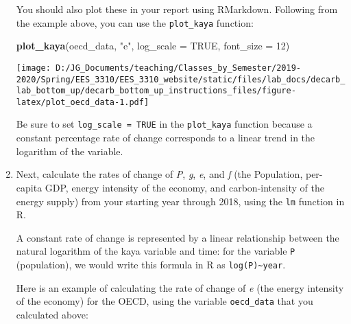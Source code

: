 \documentclass[
]{article}
\newenvironment{Shaded}{\begin{snugshade}}{\end{snugshade}}
\newcommand{\CommentTok}[1]{\textcolor[rgb]{0.56,0.35,0.01}{\textit{#1}}}
\newcommand{\DataTypeTok}[1]{\textcolor[rgb]{0.13,0.29,0.53}{#1}}
\newcommand{\DecValTok}[1]{\textcolor[rgb]{0.00,0.00,0.81}{#1}}
\newcommand{\KeywordTok}[1]{\textcolor[rgb]{0.13,0.29,0.53}{\textbf{#1}}}
\newcommand{\NormalTok}[1]{#1}
\newcommand{\OperatorTok}[1]{\textcolor[rgb]{0.81,0.36,0.00}{\textbf{#1}}}
\newcommand{\OtherTok}[1]{\textcolor[rgb]{0.56,0.35,0.01}{#1}}
\newcommand{\StringTok}[1]{\textcolor[rgb]{0.31,0.60,0.02}{#1}}
\begin{document}
\begin{enumerate}
  You should also plot these in your report using RMarkdown. Following
  from the example above, you can use the \texttt{plot\_kaya} function:

\begin{Shaded}
\begin{Highlighting}[]
\KeywordTok{plot\_kaya}\NormalTok{(oecd\_data, }\StringTok{"e"}\NormalTok{, }\DataTypeTok{log\_scale =} \OtherTok{TRUE}\NormalTok{, }\DataTypeTok{font\_size =} \DecValTok{12}\NormalTok{)}
\end{Highlighting}
\end{Shaded}

  \texttt{[image: D:/JG\_Documents/teaching/Classes\_by\_Semester/2019-2020/Spring/EES\_3310/EES\_3310\_website/static/files/lab\_docs/decarb\_lab\_bottom\_up/decarb\_bottom\_up\_instructions\_files/figure-latex/plot\_oecd\_data-1.pdf]}

  Be sure to set \texttt{log\_scale\ =\ TRUE} in the \texttt{plot\_kaya}
  function because a constant percentage rate of change corresponds to a
  linear trend in the logarithm of the variable.
\item
  Next, calculate the rates of change of \emph{P}, \emph{g}, \emph{e},
  and \emph{f} (the Population, per-capita GDP, energy intensity of the
  economy, and carbon-intensity of the energy supply) from your starting
  year through 2018, using the \texttt{lm} function in R.

  A constant rate of change is represented by a linear relationship
  between the natural logarithm of the kaya variable and time: for the
  variable \texttt{P} (population), we would write this formula in R as
  \texttt{log(P)\textasciitilde{}year}.

  Here is an example of calculating the rate of change of \emph{e} (the
  energy intensity of the economy) for the OECD, using the variable
  \texttt{oecd\_data} that you calculated above:

\begin{Shaded}
\end{Shaded}


\end{enumerate}
\end{document}
